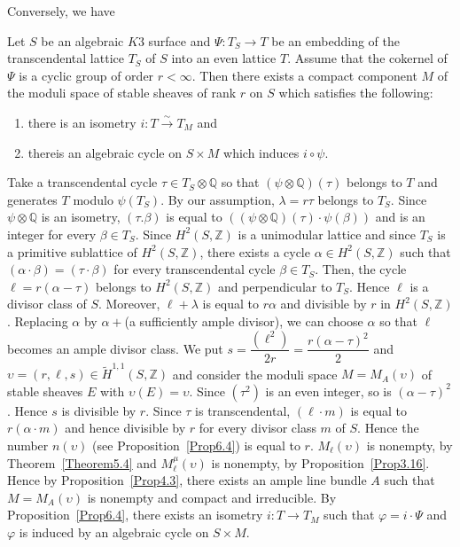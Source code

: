 Conversely, we have 

\begin{Prop}\label{Prop6.6}
Let $S$ be an algebraic $K3$ surface and $\Psi:T_S\to T$ be an
embedding of the transcendental lattice $T_S$ of $S$ into an even
lattice $T$. Assume that the cokernel of $\Psi$ is a cyclic group of
order $r<\infty$. Then there exists a compact component $M$ of the
moduli space of stable sheaves of rank $r$ on $S$ which satisfies the
following: 
\begin{enumerate}
\renewcommand{\labelenumi}{(\theenumi)}
\item there is an isometry $i:T\xrightarrow{\sim} T_M$ and 

\item there\pageoriginale is an algebraic cycle on $S\times M$ which induces
$i\circ \psi$. 
\end{enumerate}
\end{Prop}

\begin{Proof}
Take a transcendental cycle $\tau\in T_S\otimes \mathbb{Q}$ so that
$(\psi\otimes \mathbb{Q})(\tau)$ belongs to $T$ and generates $T$
modulo $\psi(T_S)$. By our assumption, $\lambda=r\tau$ belongs to
$T_S$. Since $\psi\otimes \mathbb{Q}$ is an isometry, $(\tau. \beta)$
is equal to $((\psi \otimes \mathbb{Q})(\tau)\cdot \psi (\beta))$ and
is an integer for every $\beta \in T_S$. Since $H^{2}(S,\mathbb{Z})$
is a unimodular lattice and since $T_S$ is a primitive sublattice of
$H^{2}(S,\mathbb{Z})$, there exists a cycle $\alpha \in
H^{2}(S,\mathbb{Z})$ such that $(\alpha\cdot \beta)=(\tau\cdot \beta)$
for every transcendental cycle $\beta \in T_S$. Then, the cycle
$\ell=r(\alpha-\tau)$ belongs to $H^{2}(S,\mathbb{Z})$ and
perpendicular to $T_S$. Hence $\ell$ is a divisor class of
$S$. Moreover, $\ell+\lambda$ is equal to $r\alpha$ and divisible by
$r$ in $H^{2}(S,\mathbb{Z})$. Replacing $\alpha$ by $\alpha+$(a
sufficiently ample divisor), we can choose $\alpha$ so that $\ell$
becomes an ample divisor class. We put
$s=\dfrac{(\ell^{2})}{2r}=\dfrac{r(\alpha-\tau)^{2}}{2}$ and $\upsilon
=(r,\ell, s)\in \widetilde{H}^{1,1}(S,\mathbb{Z})$ and consider the
moduli space $M=M_A(\upsilon)$ of stable sheaves $E$ with
$\upsilon(E)=\upsilon$. Since $(\tau^{2})$ is an even integer, so is
$(\alpha-\tau)^{2}$. Hence $s$ is divisible by $r$. Since $\tau$ is
transcendental, $(\ell\cdot m)$ is equal to $r(\alpha\cdot m)$ and
hence divisible by $r$ for every divisor class $m$ of $S$. Hence the
number $n(\upsilon)$ (see Proposition~\ref{Prop6.4}) is equal to
$r$. $M_{\ell}(\upsilon)$ is nonempty, by Theorem~\ref{Theorem5.4} and
$M^{\mu}_{\ell}(\upsilon)$ is nonempty, by
Proposition~\ref{Prop3.16}. Hence by Proposition~\ref{Prop4.3}, there
exists an ample line bundle $A$ such that $M=M_A(\upsilon)$ is
nonempty and compact and irreducible. By Proposition~\ref{Prop6.4},
there exists an isometry $i:T\to T_M$ such that $\varphi=i\cdot \Psi$
and $\varphi$ is induced by an algebraic cycle on $S\times M$. 
\enprf
\end{Proof}

